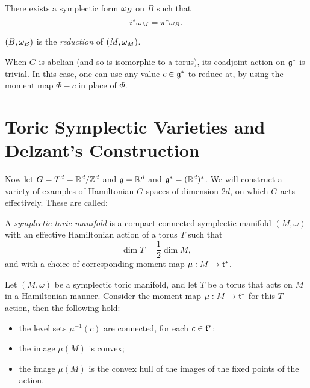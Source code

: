\begin{thm}
	There exists a symplectic form $\omega_{B}$ on $B$ such that
	\begin{equation*}
		i^{\ast}\omega_{M} = \pi^{\ast}\omega_{B}.
	\end{equation*}
\end{thm}

\begin{defn}
	$(B,\omega_{B})$ is the \emph{reduction} of $(M,\omega_{M})$.
\end{defn}

\begin{rmk}
	When $G$ is abelian (and so is isomorphic to a torus), its coadjoint action on $\mathfrak{g}^{\ast}$ is trivial. In this case, one can use any value $c \in \mathfrak{g}^{\ast}$ to reduce at, by using the moment map $\Phi - c$ in place of $\Phi$.
\end{rmk}


\section{Toric Symplectic Varieties and Delzant's Construction}

Now let $G = T^{d} = \mathbb{R}^{d}/\mathbb{Z}^{d}$ and $\mathfrak{g} = \mathbb{R}^{d}$ and $\mathfrak{g}^{\ast} = (\mathbb{R}^{d})^{\ast}$. We will construct a variety of examples of Hamiltonian $G$-spaces of dimension $2d$, on which $G$ acts effectively. These are called:

\begin{defn}
	A \emph{symplectic toric manifold} is a compact connected symplectic manifold $(M,\omega)$  with an effective Hamiltonian action of a torus $T$ such that
	\begin{equation*}
	\dim T = \frac{1}{2}\dim M,
	\end{equation*}
	and with a choice of corresponding moment map $\mu: M \rightarrow \mathfrak{t}^{\ast}$.
\end{defn}


\begin{thm}
	Let $(M,\omega)$ be a symplectic toric manifold, and let $T$ be a torus that acts on $M$ in a Hamiltonian manner. Consider the moment map $\mu : M \rightarrow \mathfrak{t}^{\ast}$ for this $T$-action, then the following hold:
	\begin{itemize}
		\item the level sets $\mu^{-1}(c)$ are connected, for each $c \in \mathfrak{t}^{\ast}$;
		\item the image $\mu(M)$ is convex;
		\item the image $\mu(M)$ is the convex hull of the images of the fixed points of the action.
	\end{itemize}
\end{thm}

